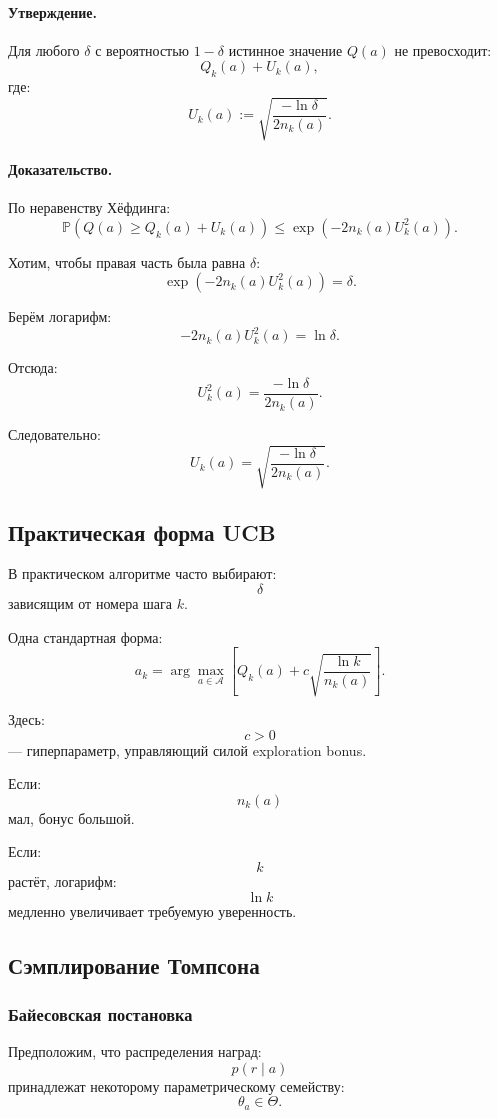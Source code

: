 \documentclass[12pt,a4paper]{article}
\begin{document}
\paragraph{Утверждение.}

Для любого $\delta$ с вероятностью $1-\delta$ истинное значение $Q(a)$ не превосходит:
\[
Q_k(a)+U_k(a),
\]
где:
\[
U_k(a)
:=
\sqrt{
\frac{-\ln\delta}{2n_k(a)}
}.
\]

\paragraph{Доказательство.}

По неравенству Хёфдинга:
\[
\mathbb P
\left(
Q(a)\ge Q_k(a)+U_k(a)
\right)
\le
\exp
\left(
-2n_k(a)U_k^2(a)
\right).
\]

Хотим, чтобы правая часть была равна $\delta$:
\[
\exp
\left(
-2n_k(a)U_k^2(a)
\right)
=
\delta.
\]

Берём логарифм:
\[
-2n_k(a)U_k^2(a)
=
\ln\delta.
\]

Отсюда:
\[
U_k^2(a)
=
\frac{-\ln\delta}{2n_k(a)}.
\]

Следовательно:
\[
U_k(a)
=
\sqrt{
\frac{-\ln\delta}{2n_k(a)}
}.
\]

\subsection{Практическая форма UCB}

В практическом алгоритме часто выбирают:
\[
\delta
\]
зависящим от номера шага $k$.

Одна стандартная форма:
\[
a_k
=
\arg\max_{a\in\mathcal A}
\left[
Q_k(a)
+
c
\sqrt{
\frac{\ln k}{n_k(a)}
}
\right].
\]

Здесь:
\[
c>0
\]
--- гиперпараметр, управляющий силой exploration bonus.

Если:
\[
n_k(a)
\]
мал, бонус большой.

Если:
\[
k
\]
растёт, логарифм:
\[
\ln k
\]
медленно увеличивает требуемую уверенность.

\subsection{Сэмплирование Томпсона}

\subsubsection{Байесовская постановка}

Предположим, что распределения наград:
\[
p(r\mid a)
\]
принадлежат некоторому параметрическому семейству:
\[
\theta_a\in\Theta.
\]
\end{document}
